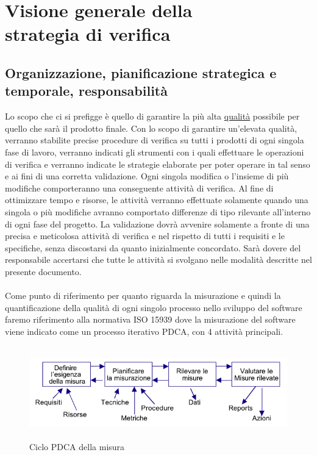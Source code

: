 


\chapter{Visione generale della \\strategia di verifica}
\thispagestyle{fancy} %

\section{Organizzazione, pianificazione strategica e \\temporale,
responsabilit\`a}

Lo scopo che ci si prefigge \`e quello di garantire la pi\`u alta
\underline{qualit\`a} possibile per quello che sar\`a il prodotto finale. Con lo
scopo di garantire un'elevata qualit\`a, verranno stabilite precise procedure di
verifica su tutti i prodotti di ogni singola fase di lavoro, verranno indicati
gli strumenti con i quali effettuare le operazioni di verifica e verranno
indicate le strategie elaborate per poter operare in tal senso e ai fini di una
corretta validazione. Ogni singola modifica o l'insieme di pi\`u modifiche
comporteranno una conseguente attivit\`a di verifica. Al fine di
ottimizzare tempo e risorse, le attivit\`a verranno effettuate solamente quando
una singola o pi\`u modifiche avranno comportato differenze di tipo rilevante
all'interno di ogni fase del progetto. La validazione dovr\`a avvenire
solamente a fronte di una precisa e meticolosa attivit\`a di verifica e nel
rispetto di tutti i requisiti e le specifiche, senza discostarsi da
quanto inizialmente concordato. Sar\`a dovere del responsabile accertarsi che
tutte le attivit\`a si svolgano nelle modalit\`a descritte nel presente documento.
\\
\\ 
Come punto di riferimento per quanto riguarda la misurazione e quindi la
quantificazione della qualit\`a di ogni singolo processo nello sviluppo del
software faremo riferimento alla normativa ISO 15939 dove la misurazione del
software viene indicato come un processo iterativo PDCA, con 4 attivit\`a
principali.

\begin{figure}[h]
  \centering
  \includegraphics[height=4cm]{img/pdca.png}
\caption{Ciclo PDCA della misura}
\end{figure}

